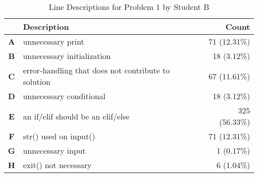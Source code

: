 \begin{table}
\centering
\caption{Line Descriptions for Problem 1 by Student B}
\label{table:problem1_studentB}
\renewcommand{\arraystretch}{0.5}
\begin{tabular}{|c|l|r|}
\hline
\textbf{}  & \textbf{Description}                                & \textbf{Count} \\ \hline
\textbf{A} & unnecessary print                                   & 71 (12.31\%)   \\ \hline
\textbf{B} & unnecessary initialization                          & 18 (3.12\%)    \\ \hline
\textbf{C} & error-handling that does not contribute to solution & 67 (11.61\%)   \\ \hline
\textbf{D} & unnecessary conditional                             & 18 (3.12\%)    \\ \hline
\textbf{E} & an if/elif should be an elif/else                   & 325 (56.33\%)  \\ \hline
\textbf{F} & str() used on input()                               & 71 (12.31\%)   \\ \hline
\textbf{G} & unnecessary input                                   & 1 (0.17\%)     \\ \hline
\textbf{H} & exit() not necessary                                & 6 (1.04\%)     \\ \hline
\end{tabular}
\end{table}
